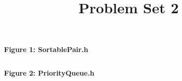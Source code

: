 \documentclass[12pt, letterpaper]{article}
\title{Problem Set 2}
\author{}
\date{}
\newcommand{\includeminted}[3]
{
  \begin{center}
  \textbf{#1}
  \vspace{-5pt}
  \inputminted[linenos, breaklines]{#2}{#3}
  \end{center}
}
\begin{document}
\normalsize
\includeminted{Figure 1: SortablePair.h}{cpp}{../src/SortablePair.h}
\clearpage
\includeminted{Figure 2: PriorityQueue.h}{cpp}{../src/PriorityQueue.h}
\end{document}
